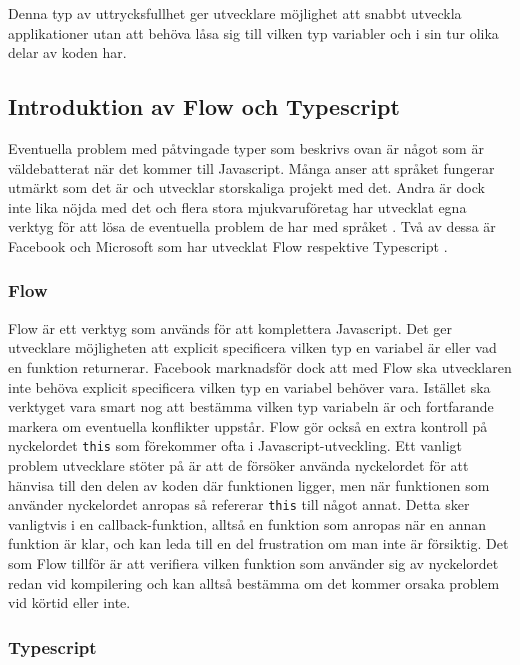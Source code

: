 Denna typ av uttrycksfullhet ger utvecklare möjlighet att snabbt utveckla applikationer utan att behöva låsa sig till vilken typ variabler och i sin tur olika delar av koden har.


\subsection{Introduktion av Flow och Typescript}

Eventuella problem med påtvingade typer som beskrivs ovan är något som är väldebatterat när det kommer till Javascript. Många anser att språket fungerar utmärkt som det är och utvecklar storskaliga projekt med det. Andra är dock inte lika nöjda med det och flera stora mjukvaruföretag har utvecklat egna verktyg för att lösa de eventuella problem de har med språket \cite{js-bad}. Två av dessa är Facebook och Microsoft som har utvecklat Flow \cite{info-flow} respektive Typescript \cite{typescript}.

\subsubsection{Flow}

Flow är ett verktyg som används för att komplettera Javascript. Det ger utvecklare möjligheten att explicit specificera vilken typ en variabel är eller vad en funktion returnerar. Facebook marknadsför dock att med Flow ska utvecklaren inte behöva explicit specificera vilken typ en variabel behöver vara. Istället ska verktyget vara smart nog att bestämma vilken typ variabeln är och fortfarande markera om eventuella konflikter uppstår. Flow gör också en extra kontroll på nyckelordet \texttt{this} som förekommer ofta i Javascript-utveckling. Ett vanligt problem utvecklare stöter på är att de försöker använda nyckelordet för att hänvisa till den delen av koden där funktionen ligger, men när funktionen som använder nyckelordet anropas så refererar \texttt{this} till något annat. Detta sker vanligtvis i en callback-funktion, alltså en funktion som anropas när en annan funktion är klar, och kan leda till en del frustration om man inte är försiktig. Det som Flow tillför är att verifiera vilken funktion som använder sig av nyckelordet redan vid kompilering och kan alltså bestämma om det kommer orsaka problem vid körtid eller inte. 

\subsubsection{Typescript}

